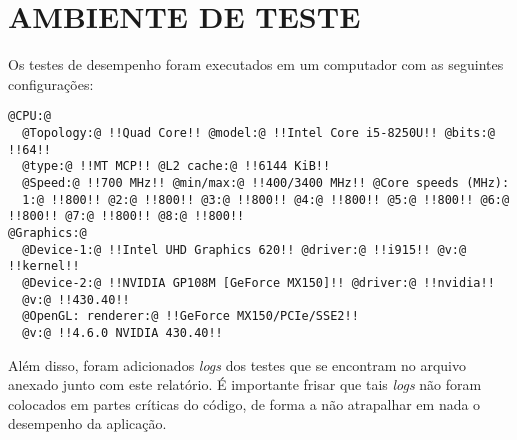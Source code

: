 \section{\normalsize AMBIENTE DE TESTE}
	Os testes de desempenho foram executados em um computador com as seguintes configurações:
	\begin{lstlisting}[frame=single,style=base]
@CPU:@
  @Topology:@ !!Quad Core!! @model:@ !!Intel Core i5-8250U!! @bits:@ !!64!! 
  @type:@ !!MT MCP!! @L2 cache:@ !!6144 KiB!! 
  @Speed:@ !!700 MHz!! @min/max:@ !!400/3400 MHz!! @Core speeds (MHz): 
  1:@ !!800!! @2:@ !!800!! @3:@ !!800!! @4:@ !!800!! @5:@ !!800!! @6:@ !!800!! @7:@ !!800!! @8:@ !!800!! 
@Graphics:@
  @Device-1:@ !!Intel UHD Graphics 620!! @driver:@ !!i915!! @v:@ !!kernel!! 
  @Device-2:@ !!NVIDIA GP108M [GeForce MX150]!! @driver:@ !!nvidia!! 
  @v:@ !!430.40!!
  @OpenGL: renderer:@ !!GeForce MX150/PCIe/SSE2!! 
  @v:@ !!4.6.0 NVIDIA 430.40!! 
    \end{lstlisting}

	Além disso, foram adicionados \textit{logs} dos testes que se encontram no arquivo anexado junto com este relatório. É importante frisar que tais \textit{logs} não foram colocados em partes críticas do código, de forma a não atrapalhar em nada o desempenho da aplicação.